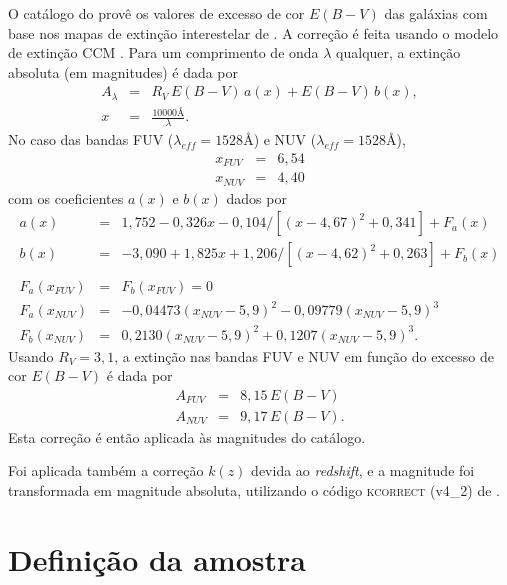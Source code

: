 O catálogo do \galex provê os valores de excesso de cor $E(B-V)$ das galáxias
com base nos mapas de extinção interestelar de \citet{Schlegel1998}. A correção
é feita usando o modelo de extinção CCM \citep[equações 4a e 4b]{Cardelli1989}.
Para um comprimento de onda $\lambda$ qualquer, a extinção absoluta (em
magnitudes) é dada por
\begin{eqnarray*}
	A_\lambda &=& R_V\,E(B-V)\,a(x) + E(B-V)\,b(x), \\
	x &=& \frac{10000\text{\AA}}{\lambda}.
\end{eqnarray*}
No caso das bandas FUV ($\lambda_{eff}=1528\text{\AA}$) e NUV
($\lambda_{eff}=1528\text{\AA}$),
\begin{eqnarray*}
	x_{FUV} &=& 6,54\\
	x_{NUV} &=& 4,40
\end{eqnarray*}
com os coeficientes $a(x)$ e $b(x)$ dados por
\begin{eqnarray*}
	a(x) &=& 1,752 - 0,326x - 0,104/[(x-4,67)^2 + 0,341] + F_a(x) \\
	b(x) &=& -3,090 + 1,825x + 1,206/[(x-4,62)^2 + 0,263] + F_b(x) \\
	\\
	F_a(x_{FUV}) &=& F_b(x_{FUV}) = 0 \\
	F_a(x_{NUV}) &=& -0,04473(x_{NUV}-5,9)^2 - 0,09779(x_{NUV}-5,9)^3 \\
	F_b(x_{NUV}) &=& 0,2130(x_{NUV}-5,9)^2 + 0,1207(x_{NUV}-5,9)^3.
\end{eqnarray*}
Usando $R_V=3,1$, a extinção nas bandas FUV e NUV em função do excesso de cor
$E(B-V)$ é dada por
\begin{eqnarray*}
	A_{FUV} &=& 8,15\,E(B-V) \\
	A_{NUV} &=& 9,17\,E(B-V).
\end{eqnarray*}
Esta correção é então aplicada às magnitudes do catálogo.

Foi aplicada também a correção $k(z)$ devida ao {\em redshift}, e a magnitude
foi transformada em magnitude absoluta, utilizando o código \textsc{kcorrect}
(v4\_2) de \citet{Blanton2007}.



\section{Definição da amostra \STARLIGHTUV}
\label{sec:Crossmatch:DefAmostras:StarlightUV}

